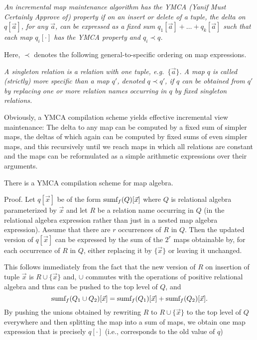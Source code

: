 \begin{definition}\em
An incremental map maintenance algorithm has the YMCA
(Yanif Must Certainly Approve of)
property if on an insert or delete of a tuple, the delta on $q[\vec{a}]$, for
any $\vec{a}$, can be expressed as a fixed sum
$q_1[\vec{a}] + \dots + q_k[\vec{a}]$ such that each map $q_i[\cdot]$ has the YMCA
property and $q_i \prec q$.
\end{definition}


Here, $\prec$ denotes the following general-to-specific ordering on map expressions.


\begin{definition}\em
A singleton relation is a relation with one tuple, e.g.\ $\{\vec{a}\}$.
A map $q$ is called (strictly) {\em more specific than}\/ a map $q'$,
denoted $q \prec q'$, if $q$ can be obtained from $q'$ by replacing
one or more relation names occurring in $q$ by fixed singleton relations.
\end{definition}


Obviously, a YMCA compilation scheme yields effective incremental view maintenance:
The delta to any map can be computed by a fixed sum of simpler maps,
the deltas of which again can be computed by fixed sums of even simpler maps,
and this recursively until we reach maps in which all relations are constant and
the maps can be reformulated as a simple arithmetic expressions over their
arguments.



\begin{theorem}
There is a YMCA compilation scheme for map algebra.
\end{theorem}


Proof.
Let $q[\vec{x}]$ be of the form
$
\mbox{sumf}_f(Q)[\vec{x}]
$
where $Q$ is relational algebra parameterized by $\vec{x}$ and let $R$ be
a relation name occurring in $Q$ (in the relational algebra expression
rather than just in a nested map algebra expression).
Assume that there are $r$ occurrences of $R$ in $Q$. Then
the updated version of $q[\vec{x}]$ can be expressed by the sum of the $2^r$
maps obtainable by, for each occurrence of $R$ in $Q$, either replacing it
by $\{ \vec{x} \}$ or leaving it unchanged.

This follows immediately from the fact that the new version of $R$ on insertion of
tuple $\vec{x}$ is $R \cup \{ \vec{x} \}$ and, $\cup$ commutes with
the operations of positive relational algebra and thus can be pushed to the top
level of $Q$, and
\[
\mbox{sumf}_f(Q_1 \cup Q_2)[\vec{x}] =
\mbox{sumf}_f(Q_1)[\vec{x}] + \mbox{sumf}_f(Q_2)[\vec{x}].
\]
By pushing the unions obtained by rewriting $R$ to $R \cup \{\vec{x}\}$ to the
top level of $Q$ everywhere and then splitting the map into a sum of maps, we obtain
one map expression that is precisely $q[\cdot]$ (i.e., corresponds to the old
value of $q$)


